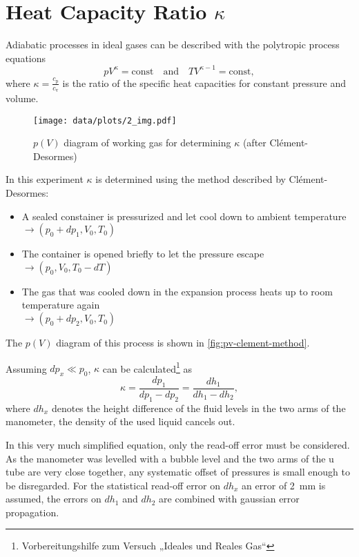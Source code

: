 \chapter{Heat Capacity Ratio $\kappa$}

Adiabatic processes in ideal gases can be described with the polytropic process equations
\begin{equation}
	pV^\kappa = \text{const} \quad \text{and} \quad TV^{\kappa - 1} = \text{const},
\end{equation}
where $\kappa = \frac{c_\text{p}}{c_\text{v}}$ is the ratio of the specific heat capacities for constant pressure and volume.

\begin{figure}[tbp]
	\centering
	\texttt{[image: data/plots/2\_img.pdf]}
	\caption[Clément-Desormes $p(V)$ Diagram]{$p(V)$ diagram of working gas for determining $\kappa$ (after Clément-Desormes)}
	\label{fig:pv-clement-method}
\end{figure}

In this experiment $\kappa$ is determined using the method described by Clément-Desormes:
\begin{itemize}
	\item A sealed constainer is pressurized and let cool down to ambient temperature\\
	\mbox{$\rightarrow (p_0 + dp_1, V_0, T_0)$}
	\item The container is opened briefly to let the pressure escape\\
	\mbox{$\rightarrow (p_0, V_0, T_0 - dT)$}
	\item The gas that was cooled down in the expansion process heats up to room temperature again\\
	\mbox{$\rightarrow (p_0 + dp_2, V_0, T_0)$}
\end{itemize}
The $p(V)$ diagram of this process is shown in \autoref{fig:pv-clement-method}.

Assuming $dp_x \ll p_0$, $\kappa$ can be calculated\footnote{Vorbereitungshilfe zum Versuch „Ideales und Reales Gas“} as
\begin{equation}
	\kappa = \frac{dp_1}{dp_1 - dp_2} = \frac{dh_1}{dh_1 - dh_2},
\end{equation}
where $dh_x$ denotes the height difference of the fluid levels in the two arms of the manometer, the density of the used liquid cancels out.

In this very much simplified equation, only the read-off error must be considered.
As the manometer was levelled with a bubble level and the two arms of the u tube are very close together, any systematic offset of pressures is small enough to be disregarded.
For the statistical read-off error on $dh_x$ an error of \SI{2}{\milli\meter} is assumed, the errors on $dh_1$ and $dh_2$ are combined with gaussian error propagation.

